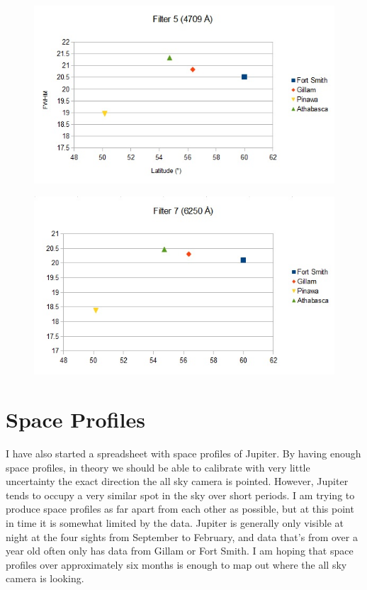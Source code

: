\documentclass[11pt]{article}
\begin{document}
\begin{figure}[h!]
\includegraphics[scale=1.0]{filter5_FWHM.jpg}
\end{figure}

\begin{figure}[h!]
\includegraphics[scale=1.0]{filter7_FWHM.jpg}
\end{figure}


\section{Space Profiles}

I have also started a spreadsheet with space profiles of Jupiter. By having enough space profiles, in theory we should be able to calibrate with very little uncertainty the exact direction the all sky camera is pointed. However, Jupiter tends to occupy a very similar spot in the sky over short periods. I am trying to produce space profiles as far apart from each other as possible, but at this point in time it is somewhat limited by the data. Jupiter is generally only visible at night at the four sights from September to February, and data that's from over a year old often only has data from Gillam or Fort Smith. I am hoping that space profiles over approximately six months is enough to map out where the all sky camera is looking. 
\end{document}
